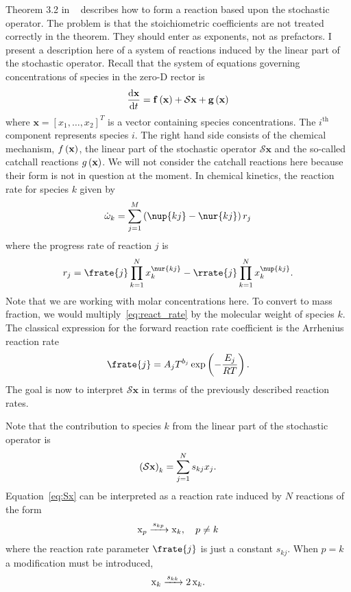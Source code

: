 Theorem 3.2 in ~\cite{morrison2016representing} describes how to form a reaction based upon the stochastic operator.  The problem is that the stoichiometric coefficients are not treated correctly in the theorem.  They should enter as exponents, not as prefactors.  I present a description here of a system of reactions induced by the linear part of the stochastic operator.  Recall that the system of equations governing concentrations of species in the zero-D rector is
\begin{align}
  \frac{\mathrm{d} \mathbf{x}}{\mathrm{d} t} = \mathbf{f}\left(\mathbf{x}\right) + \mathcal{S}\mathbf{x} + \mathbf{g}\left(\mathbf{x}\right) \label{eq:OD-system}
\end{align}
where $\mathbf{x} = \left[x_{1}, \ldots, x_{2}\right]^{T}$ is a vector containing species concentrations.  The $i^{\text{th}}$ component represents species $i$.  The right hand side consists of the chemical mechanism, $f\left(\mathbf{x}\right)$, the linear part of the stochastic operator $\mathcal{S}\mathbf{x}$ and the so-called catchall reactions $g\left(\mathbf{x}\right)$.  We will not consider the catchall reactions here because their form is not in question at the moment.  In chemical kinetics, the reaction rate for species $k$ given by
\begin{align}
  \dot{\omega}_{k} = \sum_{j=1}^{M}\lr{\nup{kj} - \nur{kj}}r_{j} \label{eq:react_rate}
\end{align}
where the progress rate of reaction $j$ is
\begin{align}
  r_{j} = \frate{j}\prod_{k=1}^{N}{x_{k}^{\nur{kj}}} - \rrate{j}\prod_{k=1}^{N}{x_{k}^{\nup{kj}}}.
\end{align}
Note that we are working with molar concentrations here.  To convert to mass fraction, we would multiply~\eqref{eq:react_rate} by the molecular weight of species $k$.  The classical expression for the forward reaction rate coefficient is the Arrhenius reaction rate
\begin{align}
  \frate{j} = A_{j}T^{b_{j}}\exp\lr{-\frac{E_{j}}{RT}} \label{eq:arrhenius}.
\end{align}
The goal is now to interpret $\mathcal{S}\mathbf{x}$ in terms of the previously described reaction rates.

Note that the contribution to species $k$ from the linear part of the stochastic operator is
\begin{align}
  \left(\mathcal{S}\mathbf{x}\right)_{k} = \sum_{j=1}^{N}{s_{kj}x_{j}}. \label{eq:Sx}
\end{align}
Equation~\eqref{eq:Sx} can be interpreted as a reaction rate induced by $N$ reactions of the form
\begin{align}
  \ce{x_{p} ->[$s_{kp}$] x_{k}}, \quad p \neq k
\end{align}
where the reaction rate parameter $\frate{j}$ is just a constant $s_{kj}$.  When $p = k$ a modification must be introduced,
\begin{align}
  \ce{x_{k} ->[$s_{kk}$] 2 x_{k}}.
\end{align}

